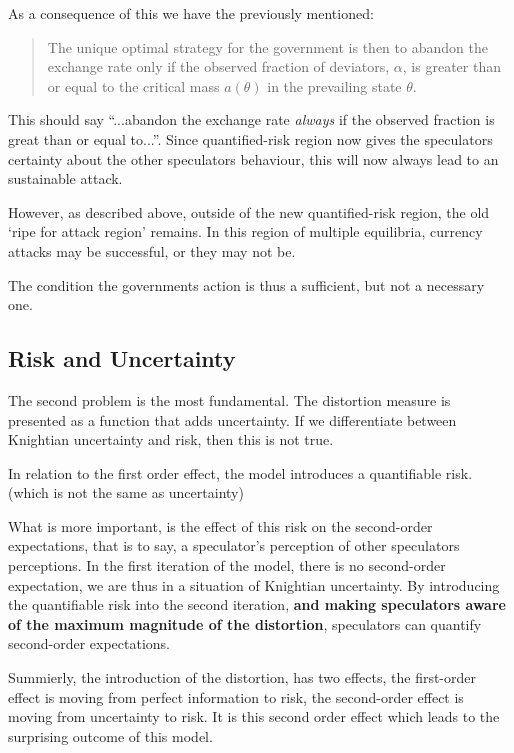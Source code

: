 \begin{refsection}
As a consequence of this we have the previously mentioned:
\begin{quotation}
	The unique optimal strategy for the government is then to abandon the exchange rate
	only if the observed fraction of deviators, $\alpha$,
	is greater than or equal to the critical mass $a(\theta)$
	in the prevailing state $\theta$.
	\parencite[p.~591]{morris1998unique}
\end{quotation}
This should say ``...abandon the exchange rate \textit{always} if the observed fraction is great than or equal to...''.
Since quantified-risk region now gives the speculators certainty about the other speculators behaviour,
this will now always lead to an sustainable attack.

However, as described above, outside of the new quantified-risk region, the old `ripe for attack region' remains.
In this region of multiple equilibria, currency attacks may be successful, or they may not be.

The condition the governments action is thus a sufficient, but not a necessary one.


\subsection{Risk and Uncertainty}
The second problem is the most fundamental. The distortion measure is presented as a function that adds uncertainty.
If we differentiate between Knightian uncertainty and risk, then this is not true.

In relation to the first order effect,
the model introduces a quantifiable risk. (which is not the same as uncertainty)

What is more important, is the effect of this risk on the second-order expectations,
that is to say, a speculator's perception of other speculators perceptions.
In the first iteration of the model, there is no second-order expectation,
we are thus in a situation of Knightian uncertainty.
By introducing the quantifiable risk into the second iteration,
\textbf{and making speculators aware of the maximum magnitude of the distortion},
speculators can quantify second-order expectations.

Summierly, the introduction of the distortion, has two effects,
the first-order effect is moving from perfect information to risk,
the second-order effect is moving from uncertainty to risk.
It is this second order effect which leads to the surprising outcome of this model.


\end{refsection}
